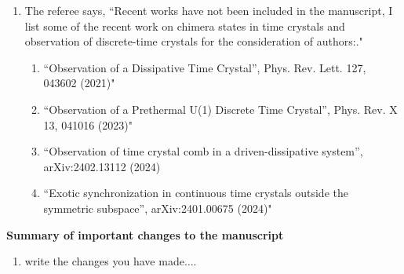 \documentclass[aps,prb,reprint,showpacs,floatfix,superscriptaddress, onecolumn, nofootinbib, 10pt]{revtex4-2}
\newcommand{\comment}[1]{{\color{blue}#1}} %
\begin{document}
\begin{enumerate}
\begin{enumerate}
		\item The referee says, \comment{``Recent works have not been included in the manuscript, I list some of the recent work on chimera states in time crystals and observation of discrete-time crystals for the consideration of authors:."}
		\begin{enumerate}
			\item \comment{``Observation of a Dissipative Time Crystal”, Phys. Rev. Lett. 127, 043602 (2021)"}
			\item \comment{``Observation of a Prethermal U(1) Discrete Time Crystal”, Phys. Rev. X 13, 041016 (2023)"}
			\item \comment{``Observation of time crystal comb in a driven-dissipative system”, arXiv:2402.13112 (2024)}
			\item \comment{``Exotic synchronization in continuous time crystals outside the symmetric subspace”, arXiv:2401.00675 (2024)"}
		\end{enumerate}
	\end{enumerate}
\end{enumerate}
		
		

	
	
\noindent \textbf{Summary of important changes to the  manuscript}
\begin{enumerate}
	\item write the changes you have made$\dots$.
\end{enumerate}
\end{document}
